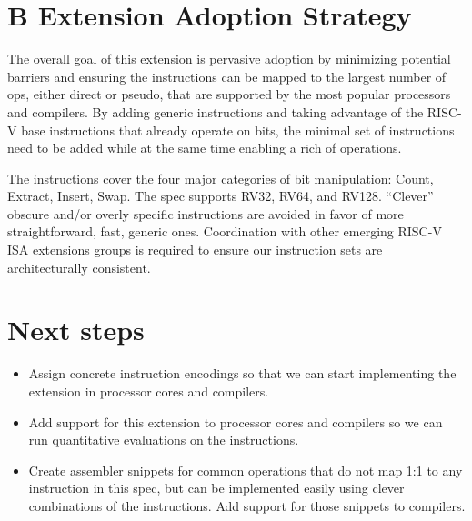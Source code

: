 \section{B Extension Adoption Strategy}

The overall goal of this extension is pervasive adoption by minimizing
potential barriers and ensuring the instructions can be mapped to the
largest number of ops, either direct or pseudo, that are supported by
the most popular processors and compilers. By adding generic
instructions and taking advantage of the RISC-V base instructions that
already operate on bits, the minimal set of instructions need to be added
while at the same time enabling a rich of operations.

The instructions cover the four major categories of bit manipulation: Count,
Extract, Insert, Swap. The spec supports RV32, RV64, and RV128. ``Clever''
obscure and/or overly specific instructions are avoided in favor of more
straightforward, fast, generic ones.  Coordination with other emerging RISC-V
ISA extensions groups is required to ensure our instruction sets are
architecturally consistent.

\section{Next steps}

\begin{itemize}
\item
  Assign concrete instruction encodings so that we can start
  implementing the extension in processor cores and compilers.
\item
  Add support for this extension to processor cores and compilers
  so we can run quantitative evaluations on the instructions.
\item
  Create assembler snippets for common operations that do not map 1:1
  to any instruction in this spec, but can be implemented easily using
  clever combinations of the instructions. Add support for those snippets
  to compilers.
\end{itemize}
